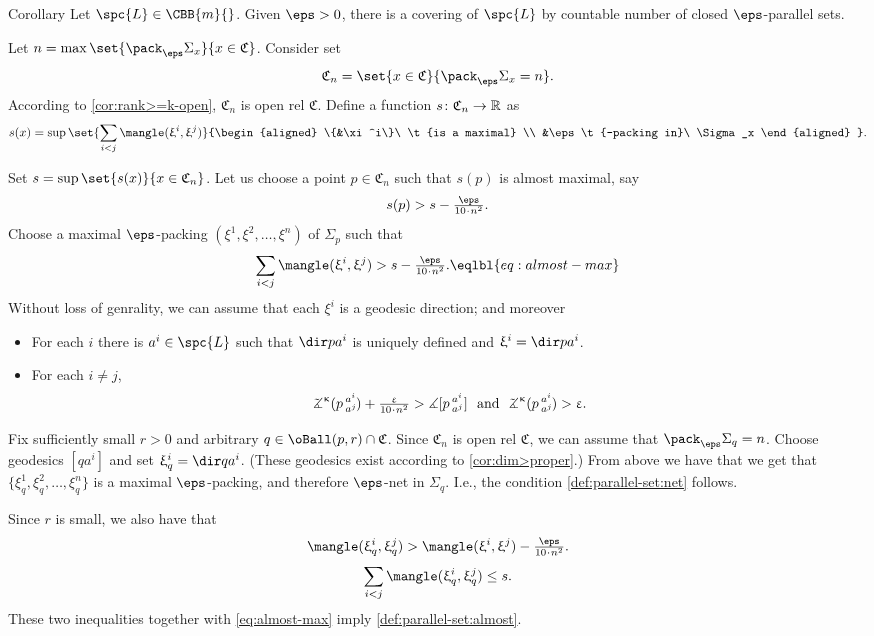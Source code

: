 \begin{thm}{Corollary}
Let $\spc{L}\in\CBB{m}{}$.
Given $\eps>0$,
there is a covering of $\spc{L}$ by countable number of closed  $\eps$-parallel sets. 
 
\end{thm}


Let $n=\max\set{\pack_\eps\Sigma_x}{x\in\mathfrak{C}}$.
Consider set 
\[\mathfrak{C}_n=\set{x\in\mathfrak{C}}{\pack_\eps\Sigma_x=n}.\]
According to \ref{cor:rank>=k-open}, $\mathfrak{C}_n$ is open rel $\mathfrak{C}$.
Define a function $s\:\mathfrak{C}_n\to\RR$ as
\[s(x)
=
\sup\set{\sum_{i<j}\mangle(\xi^i,\xi^j)}%
{\begin{aligned}
\{&\xi^i\}\ \t{is a maximal}
\\
&\eps\t{-packing in}\ \Sigma_x
 \end{aligned}
}.\]

Set $s=\sup\set{s(x)}{x\in \mathfrak{C}_n}$.
Let us choose a point 
$p\in\mathfrak{C}_n$ such that $s(p)$ is almost maximal,
say 
\[s(p)>s-\tfrac{\eps}{10\cdot n^2}.\]
Choose a maximal $\eps$-packing $(\xi^1,\xi^2,\dots,\xi^n)$ of $\Sigma_p$ 
such that 
\[\sum_{i<j}\mangle(\xi^i,\xi^j)>s-\tfrac{\eps}{10\cdot n^2}.\eqlbl{eq:almost-max}\]
Without loss of genrality, we can assume that each $\xi^i$
is a geodesic direction;
and 
moreover
\begin{itemize}
\item For each $i$ there is $a^i\in\spc{L}$
such that $\dir p{a^i}$ is uniquely defined and $\xi^i=\dir p{a^i}$.
\item For each $i\ne j$,  
$$\angk\kappa p{a^i}{a^j}+\tfrac{\eps}{10\cdot n^2}>\mangle\hinge p{a^i}{a^j}\ \ 
\text{and}
\ \ \angk\kappa p{a^i}{a^j}>\eps.$$
\end{itemize}
  

Fix sufficiently small $r>0$
and arbitrary $q\in \oBall(p,r)\cap \mathfrak{C}$.
Since $\mathfrak{C}_n$ is open rel $\mathfrak{C}$,
we can assume that $\pack_\eps\Sigma_q=n$.
Choose
 geodesics $[qa^i]$ 
and set $\xi^i_q=\dir q{a^i}$.
(These geodesics exist according to \ref{cor:dim>proper}.)
From above we have that
we get that $\{\xi^1_q,\xi^2_q,\dots,\xi^n_q\}$ is a maximal $\eps$-packing, and therefore $\eps$-net in $\Sigma_q$.
I.e., the condition \ref{def:parallel-set:net} follows.

Since $r$ is small, we also have that
\[\mangle(\xi^i_q,\xi^j_q)>\mangle(\xi^i,\xi^j)-\tfrac{\eps}{10\cdot n^2}.\] 
\[\sum_{i<j}\mangle(\xi^i_q,\xi^j_q)\le s.\]
These two inequalities together with \ref{eq:almost-max} imply \ref{def:parallel-set:almost}.
\qeds




